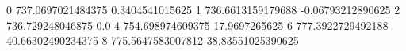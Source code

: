 0 737.0697021484375 0.3404541015625
1 736.6613159179688 -0.06793212890625
2 736.729248046875 0.0
4 754.698974609375 17.9697265625
6 777.3922729492188 40.66302490234375
8 775.5647583007812 38.83551025390625
